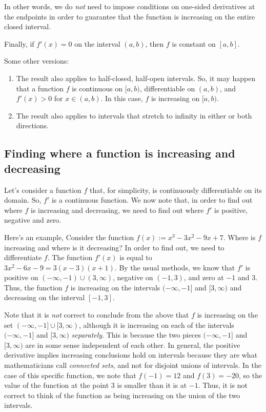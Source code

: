 \documentclass[10pt]{amsart}
\begin{document}
In other words, we do {\em not} need to impose conditions on one-sided
derivatives at the endpoints in order to guarantee that the function
is increasing on the entire closed interval.

Finally, if $f'(x) = 0$ on the interval $(a,b)$, then $f$ is constant
on $[a,b]$.

Some other versions:

\begin{enumerate}
\item The result also applies to half-closed, half-open intervals. So,
  it may happen that a function $f$ is continuous on $[a,b)$,
  differentiable on $(a,b)$, and $f'(x) > 0$ for $x \in (a,b)$. In
  this case, $f$ is increasing on $[a,b)$.
\item The result also applies to intervals that stretch to infinity in
  either or both directions.
\end{enumerate}

\subsection{Finding where a function is increasing and decreasing}

Let's consider a function $f$ that, for simplicity, is continuously
differentiable on its domain. So, $f'$ is a continuous function. We
now note that, in order to find out where $f$ is increasing and
decreasing, we need to find out where $f'$ is positive, negative and
zero.

Here's an example, Consider the function $f(x) := x^3 - 3x^2 - 9x +
7$. Where is $f$ increasing and where is it decreasing? In order to
find out, we need to differentiate $f$. The function $f'(x)$ is equal
to $3x^2 - 6x - 9 = 3(x - 3)(x + 1)$. By the usual methods, we know
that $f'$ is positive on $(-\infty,-1) \cup (3,\infty)$, negative on
$(-1,3)$, and zero at $-1$ and $3$. Thus, the function $f$ is
increasing on the intervals $(-\infty,-1]$ and $[3,\infty)$ and
decreasing on the interval $[-1,3]$.

Note that it is {\em not} correct to conclude from the above that $f$
is increasing on the set $(-\infty,-1] \cup [3,\infty)$, although it
is increasing on each of the intervals $(-\infty,-1]$ and $[3,\infty)$
{\em separately}. This is because the two pieces $(-\infty,-1]$ and
$[3,\infty)$ are in some sense independent of each other. In general,
the positive derivative implies increasing conclusions hold on
intervals because they are what mathematicians call {\em connected
sets}, and not for disjoint unions of intervals. In the case of this
specific function, we note that $f(-1) = 12$ and $f(3) = -20$, so the
value of the function at the point $3$ is smaller than it is at
$-1$. Thus, it is not correct to think of the function as being
increasing on the union of the two intervals.
\end{document}
